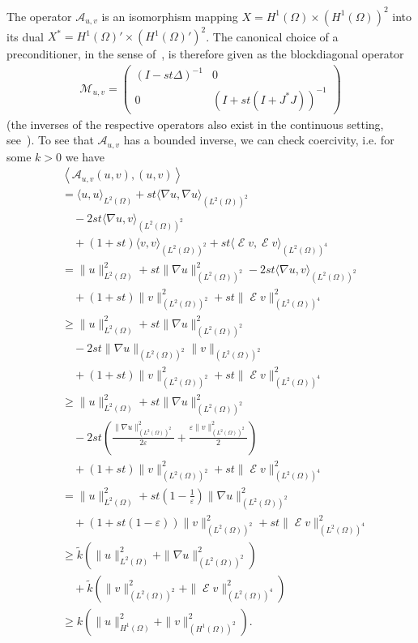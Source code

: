 \documentclass[twocolumn,envcountsame]{svjour3}
\newcommand{\MA}{\mathcal{A}}
\DeclareMathOperator{\symgrad}{\mathcal{E}}
\begin{document}
The operator $\MA_{u,v}$ is an isomorphism mapping $X=H^1(\Omega)\times (H^1(\Omega))^2$ into its dual 
$X^*=H^{1}(\Omega)'\times (H^{1}(\Omega)')^2$. 
The canonical
choice of a preconditioner, in the sense of~\cite{mardal2011preconditioning}, is therefore given as the blockdiagonal operator
\begin{align*}
  \mathcal{M}_{u,v}=\begin{pmatrix} (I-st\Delta)^{-1} & 0\\ 0 &
    \left(I+ st\left(I
    + J^*J\right)\right)^{-1}\end{pmatrix}
\end{align*}
(the inverses of the respective operators also exist in the continuous setting, see~\cite[Theorem 6.6]{alt2016linfuncana}). 
To see that $\MA_{u,v}$ has a bounded inverse, we can check coercivity, i.e. for some
$k>0$ we have 
\begin{align*}
 &\left\langle \MA_{u,v}(u,v),(u,v)\right\rangle\\
 &=\langle u,u\rangle_{L^2(\Omega)} + st\langle\nabla u,\nabla u\rangle_{(L^2(\Omega))^2}\\
 &\quad-2st\langle \nabla u, v\rangle_{(L^2(\Omega))^2}\\
 &\quad+(1+st)\langle v, v\rangle_{(L^2(\Omega))^2} + st\langle
  \symgrad v,\symgrad v\rangle_{(L^2(\Omega))^4}\\
 &=\|u\|^2_{L^2(\Omega)} + st\|\nabla u\|^2_{(L^2(\Omega))^2}
 -2st\langle \nabla u, v\rangle_{(L^2(\Omega))^2} \\
 &\quad +(1+st)\|v\|^2_{(L^2(\Omega))^2} + st\|\symgrad v\|^2_{(L^2(\Omega))^4}\\
 &\geq\|u\|^2_{L^2(\Omega)} + st\|\nabla u\|^2_{(L^2(\Omega))^2}\\
 &\quad-2st\|\nabla u\|_{(L^2(\Omega))^2}\|v\|_{(L^2(\Omega))^2} \\
 &\quad+(1+st)\|v\|^2_{(L^2(\Omega))^2} + st\|\symgrad v\|^2_{(L^2(\Omega))^4}\\
 &\geq\|u\|^2_{L^2(\Omega)} + st\|\nabla u\|^2_{(L^2(\Omega))^2}\\
 &\quad-2st\left(\frac{\|\nabla u\|^2_{(L^2(\Omega))^2}}{2\varepsilon}+\frac{\varepsilon\|v\|^2_{(L^2(\Omega))^2}}{2}\right) \\
 &\quad+(1+st)\|v\|^2_{(L^2(\Omega))^2} + st\|\symgrad v\|^2_{(L^2(\Omega))^4}\\
 &=\|u\|^2_{L^2(\Omega)} + st(1-\frac{1}{\varepsilon})\|\nabla u\|^2_{(L^2(\Omega))^2}\\
 &\quad+(1+st(1-\varepsilon))\|v\|^2_{(L^2(\Omega))^2} + st\|\symgrad v\|^2_{(L^2(\Omega))^4}\\
 &\geq \tilde k\left(\|u\|^2_{L^2(\Omega)} + \|\nabla
 u\|^2_{(L^2(\Omega))^2}\right)\\
 &\quad + \tilde k\left(\|v\|^2_{(L^2(\Omega))^2}
 + \|\symgrad v\|^2_{(L^2(\Omega))^4}\right)\\
 &\geq k\left(\|u\|_{H^1(\Omega)}^2+\|v\|^2_{(H^1(\Omega))^2}\right).
\end{align*}
\end{document}
